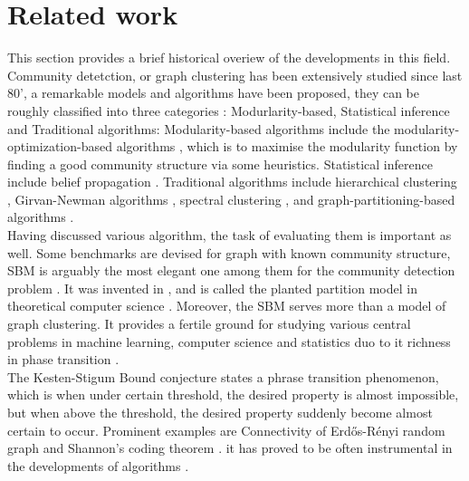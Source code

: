 \section{Related work}
This section provides a brief historical overiew of the developments in this field. Community detetction, or graph clustering has been extensively studied since last 80', a remarkable models and algorithms have been proposed, they can be roughly classified into three categories \cite{review_algo}: Modurlarity-based, Statistical inference and Traditional algorithms: Modularity-based algorithms include the modularity-optimization-based algorithms \cite{review_1_modu_Newman} \cite{review_2_modu_Newman}, which is to maximise the modularity function by finding a good community structure via some heuristics. Statistical inference include belief propagation \cite{TheSurvey} \cite{TheConjecture}. Traditional algorithms include hierarchical clustering \cite{comm_dete_in_graphs}, Girvan-Newman algorithms \cite{review_Newman}, spectral clustering \cite{spec_review_1} \cite{spec_review_2}, and graph-partitioning-based algorithms \cite{partition_review}.\\
Having discussed various algorithm, the task of evaluating them is important as well. Some benchmarks are devised for graph with known community structure, SBM is arguably the most elegant one among them for the community detection problem \cite{TheConjecture} \cite{userguide}. It was invented in \cite{sbm-review_1}, and is called the planted partition model in theoretical computer science \cite{df89}. Moreover, the SBM serves more than a model of graph clustering. It provides a fertile ground for studying various central problems in machine learning, computer science and statistics duo to it richness in phase transition \cite{TheConjecture} \cite{Emmanuel_sbm}. \\
The Kesten-Stigum Bound conjecture states a phrase transition phenomenon, which is when under certain threshold, the desired property is almost impossible, but when above the threshold, the desired property suddenly become almost certain to occur. Prominent examples are Connectivity of Erd\H{o}s-R\'{e}nyi random graph and Shannon's coding theorem \cite{shannon}. it has proved to be often instrumental in the developments of algorithms \cite{TheConjecture}.\\
